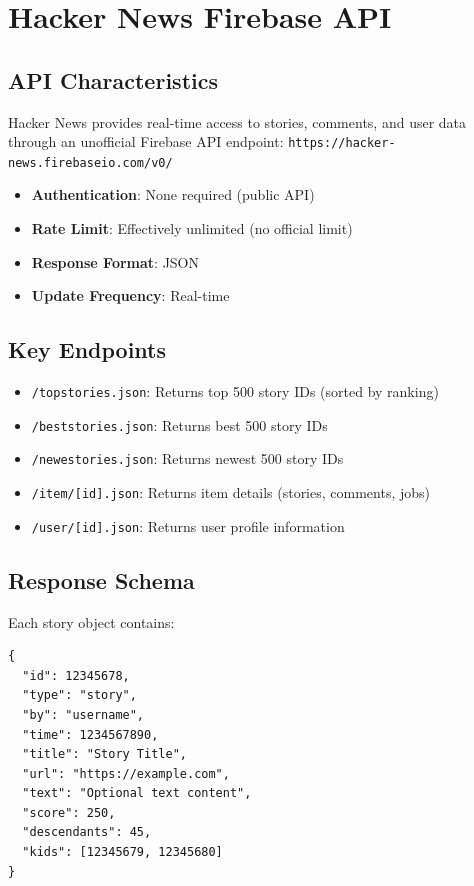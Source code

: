 \documentclass[12pt,a4paper]{report}
\begin{document}
\section{Hacker News Firebase API}

\subsection{API Characteristics}

Hacker News provides real-time access to stories, comments, and user data through an unofficial Firebase API endpoint: \texttt{https://hacker-news.firebaseio.com/v0/}

\begin{itemize}
    \item \textbf{Authentication}: None required (public API)
    \item \textbf{Rate Limit}: Effectively unlimited (no official limit)
    \item \textbf{Response Format}: JSON
    \item \textbf{Update Frequency}: Real-time
\end{itemize}

\subsection{Key Endpoints}

\begin{itemize}
    \item \texttt{/topstories.json}: Returns top 500 story IDs (sorted by ranking)
    \item \texttt{/beststories.json}: Returns best 500 story IDs
    \item \texttt{/newestories.json}: Returns newest 500 story IDs
    \item \texttt{/item/[id].json}: Returns item details (stories, comments, jobs)
    \item \texttt{/user/[id].json}: Returns user profile information
\end{itemize}

\subsection{Response Schema}

Each story object contains:

\begin{lstlisting}
{
  "id": 12345678,
  "type": "story",
  "by": "username",
  "time": 1234567890,
  "title": "Story Title",
  "url": "https://example.com",
  "text": "Optional text content",
  "score": 250,
  "descendants": 45,
  "kids": [12345679, 12345680]
}
\end{lstlisting}
\end{document}
